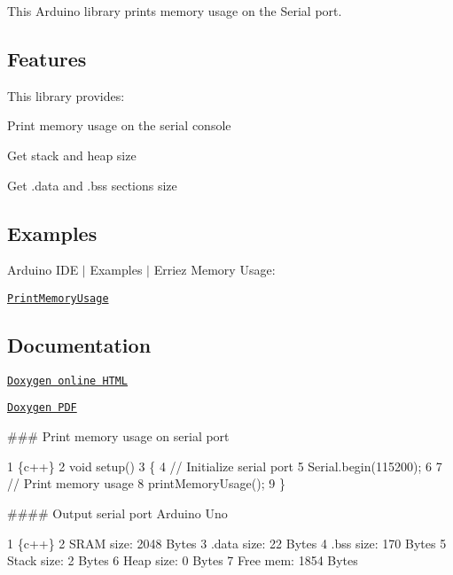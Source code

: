 \href{https://travis-ci.org/Erriez/ErriezMemoryUsage}{\tt }

This Arduino library prints memory usage on the Serial port.



\subsection*{Features}

This library provides\+:
\begin{DoxyItemize}
\item Print memory usage on the serial console
\item Get stack and heap size
\item Get .data and .bss sections size
\end{DoxyItemize}

\subsection*{Examples}

Arduino I\+DE $\vert$ Examples $\vert$ Erriez Memory Usage\+:


\begin{DoxyItemize}
\item \href{https://github.com/Erriez/ErriezMemoryUsage/blob/master/examples/PrintMemoryUsage/PrintMemoryUsage.ino}{\tt Print\+Memory\+Usage}
\end{DoxyItemize}

\subsection*{Documentation}


\begin{DoxyItemize}
\item \href{https://erriez.github.io/ErriezMemoryUsage}{\tt Doxygen online H\+T\+ML}
\item \href{https://github.com/Erriez/ErriezMemoryUsage/raw/gh-pages/latex/ErriezMemoryUsage.pdf}{\tt Doxygen P\+DF}
\end{DoxyItemize}

\#\#\# Print memory usage on serial port 
\begin{DoxyCode}
1 \{c++\}
2 void setup()
3 \{
4   // Initialize serial port
5   Serial.begin(115200);
6 
7   // Print memory usage
8   printMemoryUsage();
9 \}
\end{DoxyCode}


\#\#\#\# Output serial port Arduino Uno 
\begin{DoxyCode}
1 \{c++\}
2 SRAM size:  2048 Bytes
3 .data size: 22 Bytes
4 .bss size:  170 Bytes
5 Stack size: 2 Bytes
6 Heap size:  0 Bytes
7 Free mem:   1854 Bytes
\end{DoxyCode}


